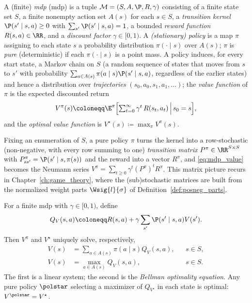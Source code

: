 \begin{definition}\label{def:mdp}
A (finite) \emph{\acl{mdp}} (\acs{mdp}) \parencite{Puterman1994mdp,SuttonBarto2018rl} is a tuple $\mathcal{M} = (S, A, \P, R, \gamma)$ consisting of a finite state set $S$, a finite nonempty action set $A(s)$ for each $s \in S$, a \emph{transition kernel} $\P(s' \mid s, a) \ge 0$ with $\sum_{s'} \P(s' \mid s, a) = 1$, a bounded \emph{reward function} $R(s, a) \in \RR$, and a \emph{discount factor} $\gamma \in [0, 1)$. A \emph{(stationary) policy} is a map $\pi$ assigning to each state $s$ a probability distribution $\pi(\cdot \mid s)$ over $A(s)$; $\pi$ is \emph{pure} (deterministic) if each $\pi(\cdot \mid s)$ is a point mass. A policy induces, for every start state, a Markov chain on $S$ (a random sequence of states that moves from $s$ to $s'$ with probability $\sum_{a\in A(s)}\pi(a\mid s)\P(s'\mid s,a)$, regardless of the earlier states) and hence a distribution over \emph{trajectories} $(s_0, a_0, s_1, a_1, \ldots)$; the \emph{value function} of $\pi$ is the expected discounted return
\begin{equation}
	V^{\pi}(s) \coloneqq \E^{\pi}\Bigl[ \textstyle\sum_{t=0}^{\infty} \gamma^{t}\, R(s_t, a_t) \,\Big|\, s_0 = s \Bigr],
	\label{eq:mdp_value}
\end{equation}
and the \emph{optimal value function} is $V^{\star}(s) \coloneqq \max_{\pi} V^{\pi}(s)$.
\end{definition}

Fixing an enumeration of $S$, a pure policy $\pi$ turns the kernel into a row-stochastic (non-negative, with every row summing to one) \emph{transition matrix} $P^{\pi} \in \RR^{S \times S}$ with $P^{\pi}_{s s'} = \P(s' \mid s, \pi(s))$ and the reward into a vector $R^{\pi}$, and \eqref{eq:mdp_value} becomes the Neumann series $V^{\pi} = \sum_{t \ge 0} \gamma^t (P^{\pi})^t R^{\pi}$. This matrix picture recurs in Chapter~\ref{ch:game_theory}, where the (sub)stochastic matrices are built from the normalized weight parts $\Wsig{l}{\sigma}$ of Definition~\ref{def:posneg_parts}.

\begin{proposition}\label{prop:bellman}
For a finite \ac{mdp} with $\gamma\in[0,1)$, define
\[
Q_V(s,a)\coloneqq R(s,a)+\gamma\sum_{s'}\P(s'\mid s,a)V(s').
\]
Then $V^{\pi}$ and $V^{\star}$ uniquely solve, respectively,
\begin{align}
V(s)&=\sum_{a\in A(s)}\pi(a\mid s)Q_V(s,a), &&s\in S, \label{eq:bellman_evaluation}\\
V(s)&=\max_{a\in A(s)}Q_V(s,a), &&s\in S. \label{eq:bellman_optimality}
\end{align}
The first is a linear system; the second is the \emph{Bellman optimality equation}. Any pure policy $\polstar$ selecting a maximizer of $Q_{V^{\star}}$ in each state is optimal: $V^{\polstar}=V^{\star}$.
\end{proposition}

